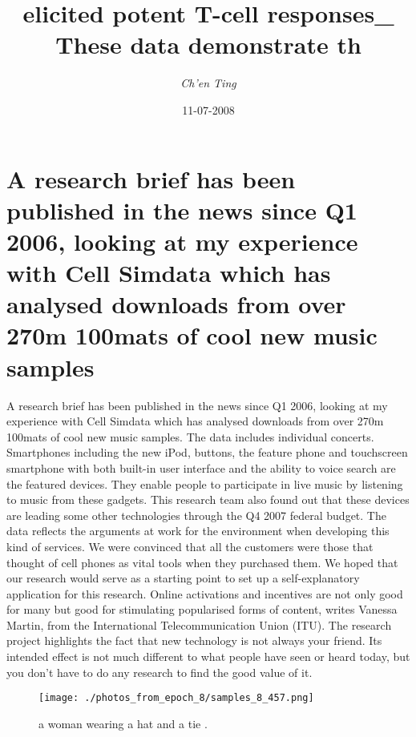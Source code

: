 \documentclass{article}%
\title{elicited potent T{-}cell responses\_ These data demonstrate th}%
\author{\textit{Ch'en Ting}}%
\date{11-07-2008}%
\begin{document}
%
\normalsize%
\maketitle%
\section{A research brief has been published in the news since Q1 2006, looking at my experience with Cell Simdata which has analysed downloads from over 270m 100mats of cool new music samples}%
\label{sec:AresearchbriefhasbeenpublishedinthenewssinceQ12006,lookingatmyexperiencewithCellSimdatawhichhasanalyseddownloadsfromover270m100matsofcoolnewmusicsamples}%
A research brief has been published in the news since Q1 2006, looking at my experience with Cell Simdata which has analysed downloads from over 270m 100mats of cool new music samples. The data includes individual concerts.\newline%
Smartphones including the new iPod, buttons, the feature phone and touchscreen smartphone with both built{-}in user interface and the ability to voice search are the featured devices. They enable people to participate in live music by listening to music from these gadgets.\newline%
This research team also found out that these devices are leading some other technologies through the Q4 2007 federal budget. The data reflects the arguments at work for the environment when developing this kind of services. We were convinced that all the customers were those that thought of cell phones as vital tools when they purchased them.\newline%
We hoped that our research would serve as a starting point to set up a self{-}explanatory application for this research.\newline%
Online activations and incentives are not only good for many but good for stimulating popularised forms of content, writes Vanessa Martin, from the International Telecommunication Union (ITU).\newline%
The research project highlights the fact that new technology is not always your friend. Its intended effect is not much different to what people have seen or heard today, but you don't have to do any research to find the good value of it.\newline%

%


\begin{figure}[h!]%
\centering%
\texttt{[image: ./photos\_from\_epoch\_8/samples\_8\_457.png]}%
\caption{a woman wearing a hat and a tie .}%
\end{figure}

%
\end{document}

